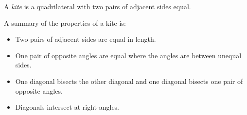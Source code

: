           
          \label{m39354*id319349}A \textsl{kite} is a quadrilateral with two pairs of adjacent sides equal.\par 
          \label{m39354*id319359}A summary of the properties of a kite is:\par 
          \label{m39354*id319362}\begin{itemize}[noitemsep]
            \label{m39354*uid86}\item Two pairs of adjacent sides are equal in length.
\label{m39354*uid87}\item One pair of opposite angles are equal where the angles are between unequal sides.
\label{m39354*uid88}\item One diagonal bisects the other diagonal and one diagonal bisects one pair of opposite angles.
\label{m39354*uid89}\item Diagonals intersect at right-angles.
\end{itemize}
        
          
    \setcounter{subfigure}{0}


